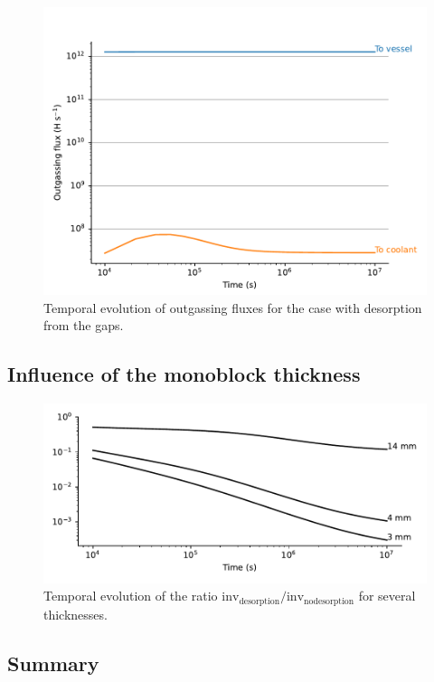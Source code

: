 \begin{figure}
    \centering
    \includegraphics[width=\linewidth]{Figures/Chapter3/monoblocks/3D_monoblocks/fluxes.pdf}
    \caption{Temporal evolution of outgassing fluxes for the case with desorption from the gaps.}
    \label{fig: fluxes DEMO monoblock}
\end{figure}

\subsection{Influence of the monoblock thickness}

\begin{figure}
    \centering
    \includegraphics[width=\linewidth]{Figures/Chapter3/monoblocks/3D_monoblocks/influence_of_thickness.pdf}
    \caption{Temporal evolution of the ratio $\mathrm{inv}_\mathrm{desorption} / \mathrm{inv}_\mathrm{no desorption}$ for several thicknesses.}
\end{figure}

\subsection{Summary}